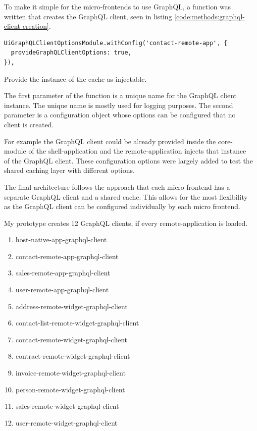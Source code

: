 To make it simple for the micro-frontends to use GraphQL, a function was written that creates the GraphQL client, seen in listing \ref{code:methods:graphql-client-creation}.

\ifshowListings
\begin{listing}[H]
\begin{verbatim}
UiGraphQLClientOptionsModule.withConfig('contact-remote-app', { 
  provideGraphQLClientOptions: true,
}),
\end{verbatim}
\caption{Provide the instance of the cache as injectable.}\label{code:methods:graphql-client-creation}
\end{listing}
\fi

The first parameter of the function is a unique name for the GraphQL client instance. The unique name is mostly used for logging purposes. The second parameter is a configuration object whose options can be configured that no client is created.  

For example the GraphQL client could be already provided inside the core-module of the shell-application and the remote-application injects that instance of the GraphQL client. These configuration options were largely added to test the shared caching layer with different options.

The final architecture follows the approach that each micro-frontend has a separate GraphQL client and a shared cache. This allows for the most flexibility as the GraphQL client can be configured individually by each micro frontend.


My prototype creates 12 GraphQL clients, if every remote-application is loaded.

\begin{enumerate}
  \item host-native-app-graphql-client
  \item contact-remote-app-graphql-client
  \item sales-remote-app-graphql-client 
  \item user-remote-app-graphql-client 
  \item address-remote-widget-graphql-client
  \item contact-list-remote-widget-graphql-client
  \item contact-remote-widget-graphql-client 
  \item contract-remote-widget-graphql-client
  \item invoice-remote-widget-graphql-client 
  \item person-remote-widget-graphql-client 
  \item sales-remote-widget-graphql-client
  \item user-remote-widget-graphql-client 
\end{enumerate}

